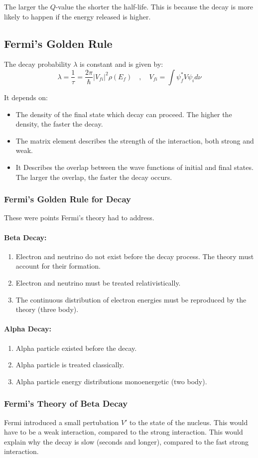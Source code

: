 The larger the $Q$-value the shorter the half-life. This is because the decay is more likely to happen if the energy released is higher.

\subsection{Fermi's Golden Rule}    
The decay probability $λ$ is constant and is given by:
\begin{equation}
  λ = \frac{1}{τ} = \frac{2π}{ℏ} |V_{fi}|^2 ρ(E_f)  \quad , \quad  V_{fi} = ∫ ψ^{*}_f V ψ_i dν
\end{equation}

\vspace{15mm}
It depends on: 
\begin{itemize}
    \item The density of the final state which decay can proceed. The higher the density, the faster the decay. 
    \item The matrix element describes the strength of the interaction, both strong and weak. 
    \item It Describes the overlap between the wave functions of initial and final states. The larger the overlap, the faster the decay occurs. 
\end{itemize}

\subsubsection{Fermi's Golden Rule for Decay}
These were points Fermi's theory had to address. 
\paragraph{Beta Decay:}
\begin{enumerate}
    \item Electron and neutrino do not exist before the decay process. The theory must account for their formation.
    \item Electron and neutrino must be treated relativistically. 
    \item The continuous distribution of electron energies must be reproduced by the theory (three body).
\end{enumerate}

\paragraph{Alpha Decay:}
\begin{enumerate}
    \item Alpha particle existed before the decay. 
    \item Alpha particle is treated classically.
    \item Alpha particle energy distributions monoenergetic (two body).
\end{enumerate}

\subsubsection{Fermi's Theory of Beta Decay}
Fermi introduced a small pertubation $V'$ to the state of the nucleus. This would have to be a weak interaction, compared to the strong interaction. This would explain why the decay is slow (seconds and longer), compared to the fast strong interaction. 